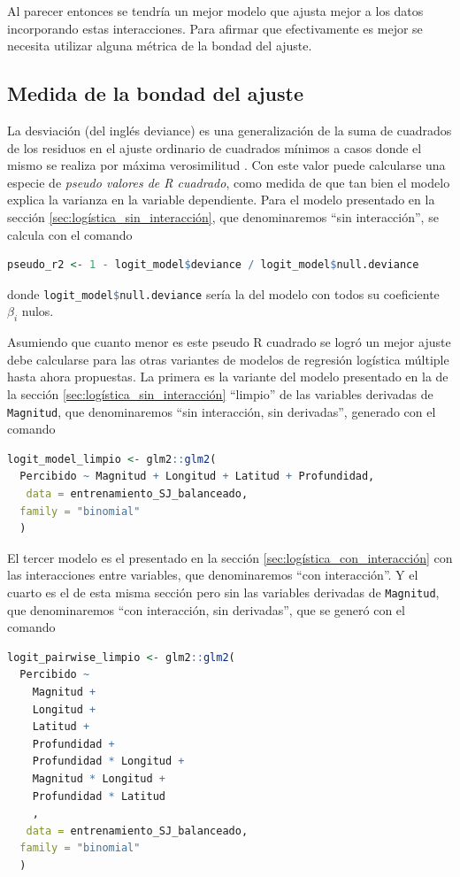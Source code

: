\documentclass[a4paper]{report}
\begin{document}
Al parecer entonces se tendría un mejor modelo que ajusta mejor a los datos incorporando estas interacciones.
Para afirmar que efectivamente es mejor se necesita utilizar alguna métrica de la bondad del ajuste.



\subsection{Medida de la bondad del ajuste}\label{sec:bondad}
La desviación (del inglés deviance) es una generalización de la suma de cuadrados de los residuos en el ajuste ordinario de cuadrados mínimos a casos donde el mismo se realiza por máxima verosimilitud \cite[sección 7.2]{hastie_elements_2009}.
Con este valor puede calcularse una especie de \emph{pseudo valores de R cuadrado}, como medida de que tan bien el modelo explica la varianza en la variable dependiente.
Para el modelo presentado en la sección \ref{sec:logística_sin_interacción}, que denominaremos ``sin interacción'', se calcula con el comando
\begin{lstlisting}[language=R, breaklines=true]
	pseudo_r2 <- 1 - logit_model$deviance / logit_model$null.deviance
\end{lstlisting}
donde \lstinline[language=R]{logit_model$null.deviance} sería la del modelo con todos su coeficiente \(\beta_i\) nulos. 

Asumiendo que cuanto menor es este pseudo R cuadrado se logró un mejor ajuste debe calcularse para las otras variantes de modelos de regresión logística múltiple hasta ahora propuestas.
La primera es la variante del modelo presentado en la de la sección \ref{sec:logística_sin_interacción} ``limpio'' de las variables derivadas de \verb'Magnitud', que denominaremos ``sin interacción, sin derivadas'', generado con el comando
\begin{lstlisting}[language=R, breaklines=true]
logit_model_limpio <- glm2::glm2(
  Percibido ~ Magnitud + Longitud + Latitud + Profundidad,
   data = entrenamiento_SJ_balanceado,
  family = "binomial"
  )
\end{lstlisting}

El tercer modelo es el presentado en la sección \ref{sec:logística_con_interacción} con las interacciones entre variables, que denominaremos ``con interacción''.
Y el cuarto es el de esta misma sección pero sin las variables derivadas de \verb'Magnitud', que denominaremos ``con interacción, sin derivadas'', que se generó con el comando
\begin{lstlisting}[language=R, breaklines=true]
	logit_pairwise_limpio <- glm2::glm2(
  Percibido ~
    Magnitud +
    Longitud +
    Latitud +
    Profundidad +
    Profundidad * Longitud +
    Magnitud * Longitud +
    Profundidad * Latitud
    ,
   data = entrenamiento_SJ_balanceado,
  family = "binomial"
  )
\end{lstlisting}
\end{document}
